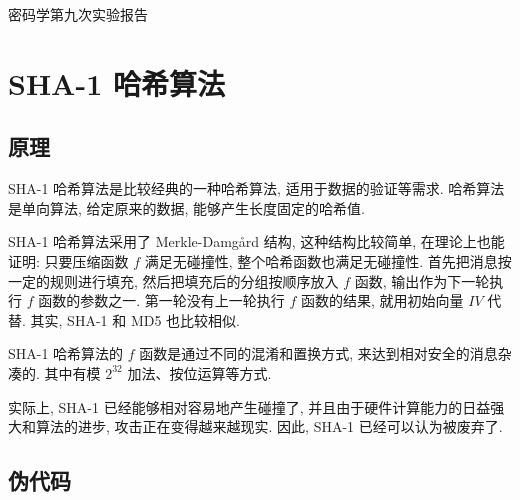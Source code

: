 \documentclass[12pt,a4paper]{article}
\begin{document}
{
\begin{center}
密码学第九次实验报告
\end{center}
}

\section*{SHA-1 哈希算法}

\subsection*{原理}

SHA-1 哈希算法是比较经典的一种哈希算法, 适用于数据的验证等需求. 哈希算法是单向算法, 给定原来的数据, 能够产生长度固定的哈希值. 

SHA-1 哈希算法采用了 Merkle-Damgård 结构, 这种结构比较简单, 在理论上也能证明: 只要压缩函数 $ f $ 满足无碰撞性, 整个哈希函数也满足无碰撞性. 首先把消息按一定的规则进行填充, 然后把填充后的分组按顺序放入 $ f $ 函数, 输出作为下一轮执行 $ f $ 函数的参数之一. 第一轮没有上一轮执行 $ f $ 函数的结果, 就用初始向量 $ IV $ 代替. 其实, SHA-1 和 MD5 也比较相似. 

SHA-1 哈希算法的 $ f $ 函数是通过不同的混淆和置换方式, 来达到相对安全的消息杂凑的. 其中有模 $ \mathrm{2^{32}} $ 加法、按位运算等方式. 

实际上, SHA-1 已经能够相对容易地产生碰撞了, 并且由于硬件计算能力的日益强大和算法的进步, 攻击正在变得越来越现实. 因此, SHA-1 已经可以认为被废弃了. 

\subsection*{伪代码}
\end{document}
